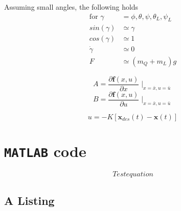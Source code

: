 Assuming small angles, the following holds
\begin{align}\label{key}
\text{for } \gamma &= \phi, \theta, \psi, \theta_L, \psi_L\\
sin(\gamma)&\simeq \gamma\\
cos(\gamma)&\simeq 1\\
\dot{\gamma} &\simeq 0\\
F &\simeq (m_Q+m_L)g
\end{align}

\begin{equation}\label{key}
A=\frac{\partial \textbf{f}(x,u)}{\partial x}\mid _{	x=\bar{x},u=\bar{u}	}
\end{equation}
\begin{equation}\label{key}
B=\frac{\partial \textbf{f}(x,u)}{\partial u}\mid _{	x=\bar{x},u=\bar{u}	}
\end{equation}

\begin{equation}\label{key}
u=-K\left[\textbf{x}_{des}(t)-\textbf{x}(t)\right] 
\end{equation}


\section{\texttt{MATLAB} code}
\begin{equation}\label{key}
Test equation
\end{equation}
\subsection{A \matlab Listing}

\lstset{language=matlab}


%
%        

%
%
